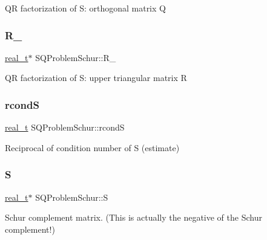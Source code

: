QR factorization of S\+: orthogonal matrix Q \mbox{\label{class_s_q_problem_schur_aec1ca7e22ec0b935840dd7d365ce589f}} 
\subsubsection{\texorpdfstring{R\+\_\+}{R\_}}
{\footnotesize\ttfamily \hyperlink{qp_o_a_s_e_s__wrapper_8h_a0d00e2b3dfadee81331bbb39068570c4}{real\+\_\+t}$\ast$ S\+Q\+Problem\+Schur\+::\+R\+\_\+\hspace{0.3cm}{\ttfamily [protected]}}

QR factorization of S\+: upper triangular matrix R \mbox{\label{class_s_q_problem_schur_a616981f9388fc8f4f9610fd8b1305015}} 
\subsubsection{\texorpdfstring{rcondS}{rcondS}}
{\footnotesize\ttfamily \hyperlink{qp_o_a_s_e_s__wrapper_8h_a0d00e2b3dfadee81331bbb39068570c4}{real\+\_\+t} S\+Q\+Problem\+Schur\+::rcondS\hspace{0.3cm}{\ttfamily [protected]}}

Reciprocal of condition number of S (estimate) \mbox{\label{class_s_q_problem_schur_aa00427f82e1a308c5b65dc80bdf41287}} 
\subsubsection{\texorpdfstring{S}{S}}
{\footnotesize\ttfamily \hyperlink{qp_o_a_s_e_s__wrapper_8h_a0d00e2b3dfadee81331bbb39068570c4}{real\+\_\+t}$\ast$ S\+Q\+Problem\+Schur\+::S\hspace{0.3cm}{\ttfamily [protected]}}

Schur complement matrix. (This is actually the negative of the Schur complement!) \mbox{\label{class_s_q_problem_schur_aab9ef0db0deec0bc0459a0b075768194}} 
